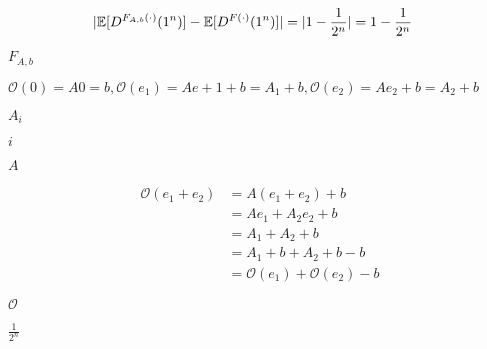 \documentclass[10pt]{book}
\begin{document}
\begin{mdSnippets}
\begin{mdDisplaySnippet}[f6ee93c4e956a325e88f0c1b394cfcb5]%
\[%
\begin{aligned}
|\E[D^{F_{A,b}(\cdot)}(1^n)] - \E[D^{F(\cdot)}(1^n)]| &= |1 - \frac{1}{2^n}| = 1 - \frac{1}{2^n}
\end{aligned}
\]%
\end{mdDisplaySnippet}%
\begin{mdInlineSnippet}[1df105281e4562a8d2291fe0d0a17a19]%
$F_{A,b}$\end{mdInlineSnippet}%
\begin{mdInlineSnippet}%
$\mathcal{O}(0) = A0 = b, \mathcal{O}(e_1) = Ae+1 + b = A_1 + b, \mathcal{O}(e_2) = Ae_2 + b = A_2 + b$\end{mdInlineSnippet}%
\begin{mdInlineSnippet}[693a3b974c23e87e8c941211cd45cfb8]%
$A_i$\end{mdInlineSnippet}%
\begin{mdInlineSnippet}[865c0c0b4ab0e063e5caa3387c1a8741]%
$i$\end{mdInlineSnippet}%
\begin{mdInlineSnippet}[7fc56270e7a70fa81a5935b72eacbe29]%
$A$\end{mdInlineSnippet}%
\begin{mdDisplaySnippet}[d3ba412b29a6b7a928b9f61f6c54628e]%
\[%
\begin{aligned}
\mathcal{O}(e_1 + e_2) &= A(e_1 + e_2) + b \\
&= Ae_1 + A_2e_2 + b \\
&= A_1 + A_2 + b \\
&= A_1 + b + A_2 + b - b \\
&= \mathcal{O}(e_1) + \mathcal{O}(e_2) - b
\end{aligned}
\]%
\end{mdDisplaySnippet}%
\begin{mdInlineSnippet}[c739e7b1285679250be773ba8e183209]%
$\mathcal{O}$\end{mdInlineSnippet}%
\begin{mdInlineSnippet}[cc1784df219b5f60fc351c3c720645b1]%
$\frac{1}{2^n}$\end{mdInlineSnippet}%
\begin{mdInlineSnippet}[d013c95d737397f88639b18535a37bb9]%

\end{mdInlineSnippet}
\end{mdSnippets}
\end{document}
